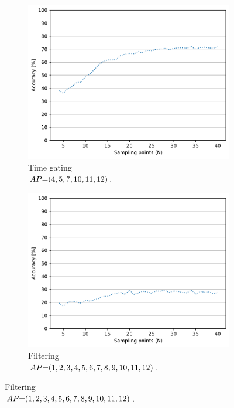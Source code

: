 \begin{figure}[t]
    \begin{subfigure}{.49\textwidth}
        \centering
        \includegraphics[width=.99\linewidth]{Figures/RadarExperiments/Datasets/ThroughMaterials/Wood+PVC/samples-timegating-ud.pdf}
        \vspace{-15pt}
        \captionsetup{width=.99\linewidth}
        \caption{Time gating \\ $\splitatcommas{AP{=}(4, 5, 7, 10, 11, 12)}$.}
        \label{fig:radar-experiments:through-materials:wood-pvc-samples:timegating-ud}
    \end{subfigure}
    \begin{subfigure}{.49\textwidth}
        \centering
        \includegraphics[width=.99\linewidth]{Figures/RadarExperiments/Datasets/ThroughMaterials/Wood+PVC/samples-filtering-ud.pdf}  
        \vspace{-15pt}
        \captionsetup{width=.99\linewidth}
        \caption{Filtering \\ $\splitatcommas{AP{=}(1, 2, 3, 4, 5, 6, 7, 8, 9, 10, 11, 12)}$.}
        \label{fig:radar-experiments:through-materials:wood-pvc-samples:filtering-ud}
    \end{subfigure}
  

\end{figure}
